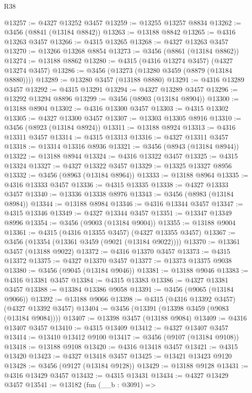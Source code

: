 \begin{lexlean}{R38}
\begin{coremodule}
@13257 := @4327 @13252 @3457
@13259 := @13255 @13257 @8834
@13262 := @3456 (@8841 (@13184 @8842))
@13263 := @13188 @8842
@13265 := @4316 @13263 @3457
@13266 := @4315 @13265
@13268 := @4327 @13263 @3457
@13270 := @13266 @13268 @8854
@13273 := @3456 (@8861 (@13184 @8862))
@13274 := @13188 @8862
@13280 := @4315 (@4316 @13274 @3457) (@4327 @13274 @3457)
@13286 := @3456 (@13273 (@13280 @3459 (@8879 (@13184 @8880))))
@13289 := @13280 @3457 (@13188 @8880)
@13291 := @4316 @13289 @3457
@13292 := @4315 @13291
@13294 := @4327 @13289 @3457
@13296 := @13292 @13294 @8896
@13299 := @3456 (@8903 (@13184 @8904))
@13300 := @13188 @8904
@13302 := @4316 @13300 @3457
@13303 := @4315 @13302
@13305 := @4327 @13300 @3457
@13307 := @13303 @13305 @8916
@13310 := @3456 (@8923 (@13184 @8924))
@13311 := @13188 @8924
@13313 := @4316 @13311 @3457
@13314 := @4315 @13313
@13316 := @4327 @13311 @3457
@13318 := @13314 @13316 @8936
@13321 := @3456 (@8943 (@13184 @8944))
@13322 := @13188 @8944
@13324 := @4316 @13322 @3457
@13325 := @4315 @13324
@13327 := @4327 @13322 @3457
@13329 := @13325 @13327 @8956
@13332 := @3456 (@8963 (@13184 @8964))
@13333 := @13188 @8964
@13335 := @4316 @13333 @3457
@13336 := @4315 @13335
@13338 := @4327 @13333 @3457
@13340 := @13336 @13338 @8976
@13343 := @3456 (@8983 (@13184 @8984))
@13344 := @13188 @8984
@13346 := @4316 @13344 @3457
@13347 := @4315 @13346
@13349 := @4327 @13344 @3457
@13351 := @13347 @13349 @8996
@13354 := @3456 (@9003 (@13184 @9004))
@13355 := @13188 @9004
@13361 := @4315 (@4316 @13355 @3457) (@4327 @13355 @3457)
@13367 := @3456 (@13354 (@13361 @3459 (@9021 (@13184 @9022))))
@13370 := @13361 @3457 (@13188 @9022)
@13372 := @4316 @13370 @3457
@13373 := @4315 @13372
@13375 := @4327 @13370 @3457
@13377 := @13373 @13375 @9038
@13380 := @3456 (@9045 (@13184 @9046))
@13381 := @13188 @9046
@13383 := @4316 @13381 @3457
@13384 := @4315 @13383
@13386 := @4327 @13381 @3457
@13388 := @13384 @13386 @9058
@13391 := @3456 (@9065 (@13184 @9066))
@13392 := @13188 @9066
@13398 := @4315 (@4316 @13392 @3457) (@4327 @13392 @3457)
@13404 := @3456 (@13391 (@13398 @3459 (@9083 (@13184 @9084))))
@13407 := @13398 @3457 (@13188 @9084)
@13409 := @4316 @13407 @3457
@13410 := @4315 @13409
@13412 := @4327 @13407 @3457
@13414 := @13410 @13412 @9100
@13417 := @3456 (@9107 (@13184 @9108))
@13418 := @13188 @9108
@13420 := @4316 @13418 @3457
@13421 := @4315 @13420
@13423 := @4327 @13418 @3457
@13425 := @13421 @13423 @9120
@13428 := @3456 (@9127 (@13184 @9128))
@13429 := @13188 @9128
@13431 := @4316 @13429 @3457
@13432 := @4315 @13431
@13434 := @4327 @13429 @3457
@13541 := @13182
    (fun (__b : @3091) =>

\end{coremodule}
\end{lexlean}
